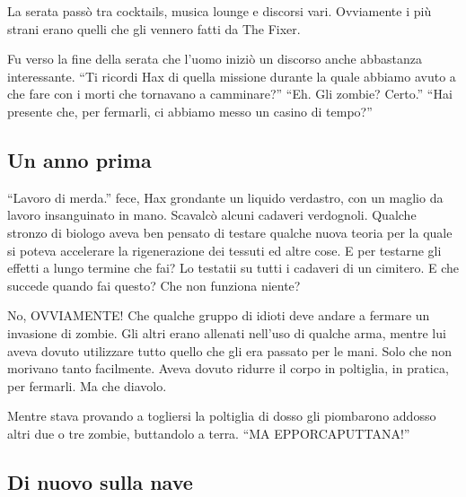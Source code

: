     La serata passò tra cocktails, musica lounge e discorsi vari.
    Ovviamente i più strani erano quelli che gli vennero fatti da The
    Fixer.

    Fu verso la fine della serata che l'uomo iniziò un discorso anche
    abbastanza interessante. ``Ti ricordi Hax di quella missione durante la
    quale abbiamo avuto a che fare con i morti che tornavano a camminare?''
    ``Eh. Gli zombie? Certo.'' ``Hai presente che, per fermarli, ci abbiamo
    messo un casino di tempo?''

    \subsection{Un anno prima}

    ``Lavoro di merda.'' fece, Hax grondante un liquido verdastro, con un
    maglio da lavoro insanguinato in mano. Scavalcò alcuni cadaveri
    verdognoli. Qualche stronzo di biologo aveva ben pensato di testare
    qualche nuova teoria per la quale si poteva accelerare la rigenerazione
    dei tessuti ed altre cose. E per testarne gli effetti a lungo termine
    che fai? Lo testatii su tutti i cadaveri di un cimitero. E che succede
    quando fai questo? Che non funziona niente?

    No, OVVIAMENTE! Che qualche gruppo di idioti deve andare a fermare un
    invasione di zombie. Gli altri erano allenati nell'uso di qualche arma,
    mentre lui aveva dovuto utilizzare tutto quello che gli era passato
    per le mani. Solo che non morivano tanto facilmente. Aveva dovuto
    ridurre il corpo in poltiglia, in pratica, per fermarli. Ma che
    diavolo.

    Mentre stava provando a togliersi la poltiglia di dosso gli piombarono
    addosso altri due o tre zombie, buttandolo a terra. ``MA
    EPPORCAPUTTANA!''

    \subsection{Di nuovo sulla nave}

